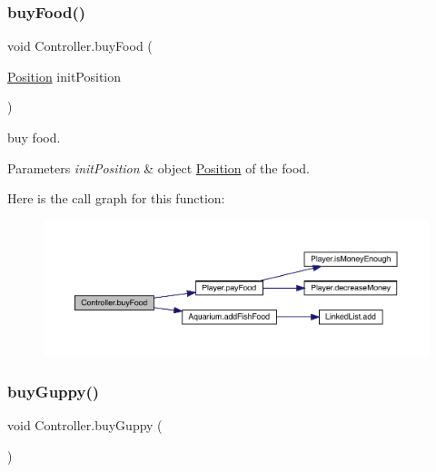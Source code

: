 \subsubsection{\texorpdfstring{buy\+Food()}{buyFood()}}
{\footnotesize\ttfamily void Controller.\+buy\+Food (\begin{DoxyParamCaption}\item[{\mbox{\hyperlink{class_position}{Position}}}]{init\+Position }\end{DoxyParamCaption})\hspace{0.3cm}{\ttfamily [inline]}}

buy food. 
\begin{DoxyParams}{Parameters}
{\em init\+Position} & object \mbox{\hyperlink{class_position}{Position}} of the food. \\
\hline
\end{DoxyParams}
Here is the call graph for this function\+:
\nopagebreak
\begin{figure}[H]
\begin{center}
\leavevmode
\includegraphics[width=350pt]{class_controller_a40a60157abffab52f9170ffb6579151e_cgraph}
\end{center}
\end{figure}
\mbox{\label{class_controller_adb93f92dca6e1d48d61d811411945aff}} 
\subsubsection{\texorpdfstring{buy\+Guppy()}{buyGuppy()}}
{\footnotesize\ttfamily void Controller.\+buy\+Guppy (\begin{DoxyParamCaption}{ }\end{DoxyParamCaption})\hspace{0.3cm}{\ttfamily [inline]}}

